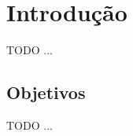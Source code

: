 \chapter{Introdução}
\label{cha:introduction}

TODO ...

\section{Objetivos}
\label{sec:objectives}

TODO ...
